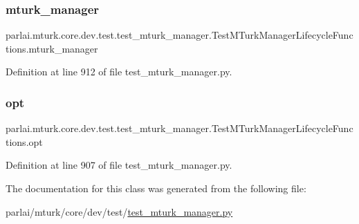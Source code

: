 \subsubsection{\texorpdfstring{mturk\+\_\+manager}{mturk\_manager}}
{\footnotesize\ttfamily parlai.\+mturk.\+core.\+dev.\+test.\+test\+\_\+mturk\+\_\+manager.\+Test\+M\+Turk\+Manager\+Lifecycle\+Functions.\+mturk\+\_\+manager}



Definition at line 912 of file test\+\_\+mturk\+\_\+manager.\+py.

\mbox{\label{classparlai_1_1mturk_1_1core_1_1dev_1_1test_1_1test__mturk__manager_1_1TestMTurkManagerLifecycleFunctions_af1ac135ec91429e6729faab342eb2026}} 
\subsubsection{\texorpdfstring{opt}{opt}}
{\footnotesize\ttfamily parlai.\+mturk.\+core.\+dev.\+test.\+test\+\_\+mturk\+\_\+manager.\+Test\+M\+Turk\+Manager\+Lifecycle\+Functions.\+opt}



Definition at line 907 of file test\+\_\+mturk\+\_\+manager.\+py.



The documentation for this class was generated from the following file\+:\begin{DoxyCompactItemize}
\item 
parlai/mturk/core/dev/test/\hyperlink{dev_2test_2test__mturk__manager_8py}{test\+\_\+mturk\+\_\+manager.\+py}\end{DoxyCompactItemize}
